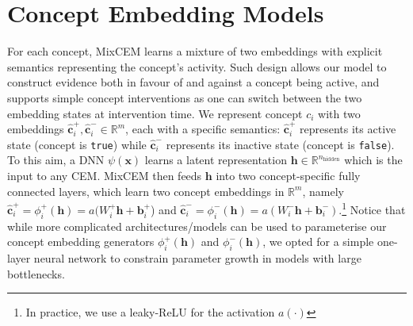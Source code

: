 \documentclass[withindex,glossary]{cam-thesis}
\theoremstyle{plain}
\theoremstyle{definition}
\theoremstyle{remark}
\begin{document}
\section{Concept Embedding Models} \label{sec:cem}
For each concept, MixCEM learns a mixture of two embeddings with explicit semantics representing the concept's activity. Such design allows our model to construct evidence both in favour of and against a concept being active, and supports simple concept interventions as one can switch between the two embedding states at intervention time.
%
%
We represent concept $c_i$ with two embeddings $\hat{\textbf{c}}^+_i, \hat{\textbf{c}}^-_i \in \mathbb{R}^m$, each with a specific semantics: $\hat{\textbf{c}}^+_i$ represents its active state (concept is \texttt{true}) while $\hat{\textbf{c}}^-_i$ represents its inactive state (concept is \texttt{false}). To this aim, a DNN $\psi(\mathbf{x})$ learns a latent representation $\mathbf{h} \in \mathbb{R}^{n_\text{hidden}}$ which is the input to any CEM. 
MixCEM then feeds $\mathbf{h}$ into two concept-specific fully connected layers, which learn two concept embeddings in $\mathbb{R}^m$, namely $\hat{\mathbf{c}}^+_i = \phi^+_i(\mathbf{h}) = a(W^+_i\mathbf{h} + \mathbf{b}^+_i$) and $\hat{\mathbf{c}}^-_i = \phi^-_i(\mathbf{h}) = a(W^-_i\mathbf{h} + \mathbf{b}^-_i)$.\footnote{In practice, we use a leaky-ReLU for the activation $a(\cdot)$} Notice that while more complicated architectures/models can be used to parameterise our concept embedding generators $\phi^+_i(\mathbf{h})$ and $\phi^-_i(\mathbf{h})$, we opted for a simple one-layer neural network to constrain parameter growth in models with large bottlenecks.
\end{document}
